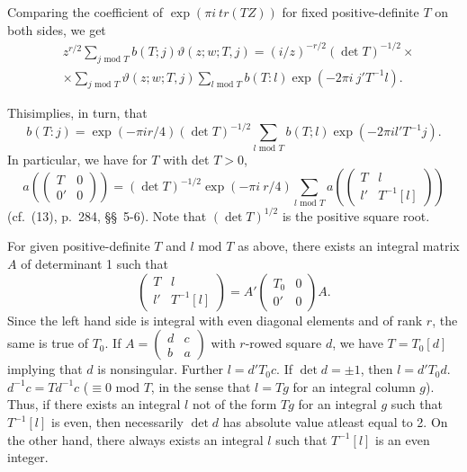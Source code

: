 Comparing the coefficient of $\exp(\pi i \ tr(TZ))$ for fixed
positive-definite $T$ on both sides, we get
\begin{align*}
& z^{r/2} \sum_{j\text{~mod~}T}b(T;j)\vartheta(z;w;T,j)=(i/z)^{-r/2}(\det
T)^{-1/2}\times \\
& \times \sum_{j\text{~mod~}T}\vartheta(z;w;T,j)\sum_{l\text{~mod~}T}b(T:l)\exp
(-2\pi i\ j'T^{-1}l).
\end{align*}

This\pageoriginale implies, in turn, that
$$
b(T:j)=\exp(-\pi ir/4)(\det T)^{-1/2}\sum_{l\text{~mod~}T}b(T;l)\exp
(-2\pi il'T^{-1}j).
$$
In particular, we have for $T$ with det $T>0$,
\begin{equation}
a\left(
\begin{pmatrix}
T & 0\\
0' & 0
\end{pmatrix}
\right)=(\det T)^{-1/2}\exp(-\pi i\ r/4)\sum_{l\text{~mod~}T}a\left(
\begin{pmatrix}
T & l\\
l' & T^{-1}[l]
\end{pmatrix}
\right)\label{art02-eq6}
\end{equation}
(cf.~\cite{art02-key1}(13), p.~284, \cite{art02-key4}\S\S\
5-6). Note that $(\det T)^{1/2}$ is the positive square
root.

For given positive-definite $T$ and $l\text{~mod~}T$ as above, there
exists an integral matrix $A$ of determinant 1 such that
\begin{equation}
\begin{pmatrix}
T & l\\
l' & T^{-1}[l]
\end{pmatrix}
=A'
\begin{pmatrix}
T_{0} & 0\\
0' & 0
\end{pmatrix}
A.\label{art02-eq7}
\end{equation}
Since the left hand side is integral with even diagonal elements and
of rank $r$, the same is true of $T_{0}$. If
$A=\left(\begin{smallmatrix} d & c\\ b & a\end{smallmatrix}\right)$
with $r$-rowed square $d$, we have $T=T_{0}[d]$ implying that $d$ is
nonsingular. Further $l=d'T_{0}c$. If $\det d=\pm 1$, then
$l=d'T_{0}d$.  $d^{-1}c=Td^{-1}c$ ($\equiv 0\text{~mod~}T$, in the
sense that $l=Tg$ for an integral column $g$). Thus, if there exists
an integral $l$ not of the form $Tg$ for an integral $g$ such that
$T^{-1}[l]$ is even, then necessarily $\det d$ has absolute value
atleast equal to 2. On the other hand, there always exists an integral
$l$ such that $T^{-1}[l]$ is an even integer.

